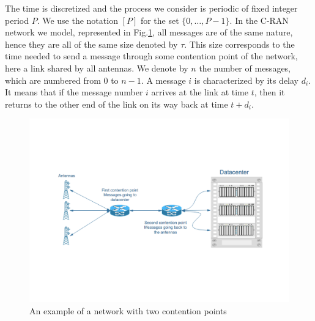 \documentclass[a4paper,UKenglish,cleveref, autoref, thm-restate]{lipics-v2019}
\begin{document}
The time is discretized and the process we consider is periodic of fixed integer period $P$. We use the notation $[P]$ for the set $\{0,\dots,P-1\}$. In the C-RAN network we model, represented in Fig.\ref{fig:model}, all messages are of the same nature, hence they are all of the same size denoted by $\tau$. This size corresponds to the time needed to send a message through some contention point of the network, here a link shared by all antennas. We denote by $n$ the number of messages, which are numbered from $0$ to $n-1$. A message $i$ is characterized by its delay $d_i$. It means that if the message number $i$ arrives at the link at time $t$, then it returns to the other end of the link on its way back at time $t + d_i$. 
\begin{center}
\begin{figure}
\centering
\includegraphics[scale=0.35]{network.pdf}
\centering
{}
\caption{An example of a network with two contention points}
\label{fig:model}
\end{figure}
\end{center}
\end{document}
